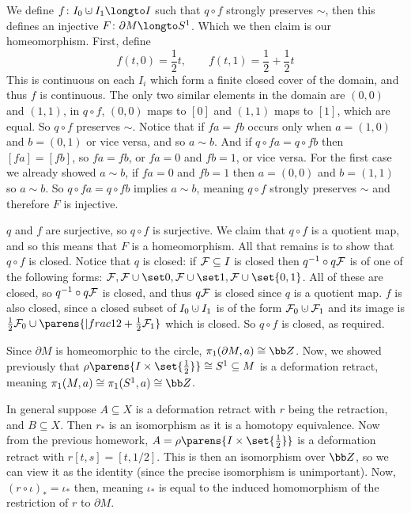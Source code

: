     We define $f\colon I_0\dcup I_1\longto I$ such that $q\circ f$ strongly preserves $\sim$, then this defines an injective $F\colon\partial M\longto S^1$.
    Which we then claim is our homeomorphism.
    First, define
    $$ f(t,0) = \frac12t,\qquad f(t,1) = \frac12+\frac12t $$
    This is continuous on each $I_i$ which form a finite closed cover of the domain, and thus $f$ is continuous.
    The only two similar elements in the domain are $(0,0)$ and $(1,1)$, in $q\circ f$, $(0,0)$ maps to $[0]$ and $(1,1)$ maps to $[1]$, which are equal.
    So $q\circ f$ preserves $\sim$.
    Notice that if $fa=fb$ occurs only when $a=(1,0)$ and $b=(0,1)$ or vice versa, and so $a\sim b$.
    And if $q\circ fa=q\circ fb$ then $[fa]=[fb]$, so $fa=fb$, or $fa=0$ and $fb=1$, or vice versa.
    For the first case we already showed $a\sim b$, if $fa=0$ and $fb=1$ then $a=(0,0)$ and $b=(1,1)$ so $a\sim b$.
    So $q\circ fa=q\circ fb$ implies $a\sim b$, meaning $q\circ f$ strongly preserves $\sim$ and therefore $F$ is injective.

    $q$ and $f$ are surjective, so $q\circ f$ is surjective.
    We claim that $q\circ f$ is a quotient map, and so this means that $F$ is a homeomorphism.
    All that remains is to show that $q\circ f$ is closed.
    Notice that $q$ is closed: if ${\cal F}\subseteq I$ is closed then $q^{-1}\circ q{\cal F}$ is of one of the following forms: ${\cal F},{\cal F}\cup\set0,{\cal F}\cup\set1,{\cal F}\cup\set{0,1}$.
    All of these are closed, so $q^{-1}\circ q{\cal F}$ is closed, and thus $q{\cal F}$ is closed since $q$ is a quotient map.
    $f$ is also closed, since a closed subset of $I_0\dcup I_1$ is of the form ${\cal F}_0\dcup{\cal F}_1$ and its image is $\frac12{\cal F}_0\cup\parens{|frac12+\frac12{\cal F}_1}$ which is closed.
    So $q\circ f$ is closed, as required.

    \item Since $\partial M$ is homeomorphic to the circle, $\pi_1(\partial M,a)\cong{\bb Z}$.
    Now, we showed previously that $\rho\parens{I\times\set{\frac12}}\cong S^1\subseteq M$ is a deformation retract, meaning $\pi_1(M,a)\cong\pi_1(S^1,a)\cong{\bb Z}$.

    In general suppose $A\subseteq X$ is a deformation retract with $r$ being the retraction, and $B\subseteq X$.
    Then $r_*$ is an isomorphism as it is a homotopy equivalence.
    Now from the previous homework, $A=\rho\parens{I\times\set{\frac12}}$ is a deformation retract with $r[t,s]=[t,1/2]$.
    This is then an isomorphism over ${\bb Z}$, so we can view it as the identity (since the precise isomorphism is unimportant).
    Now, $(r\circ\iota)_*=\iota_*$ then, meaning $\iota_*$ is equal to the induced homomorphism of the restriction of $r$ to $\partial M$.

